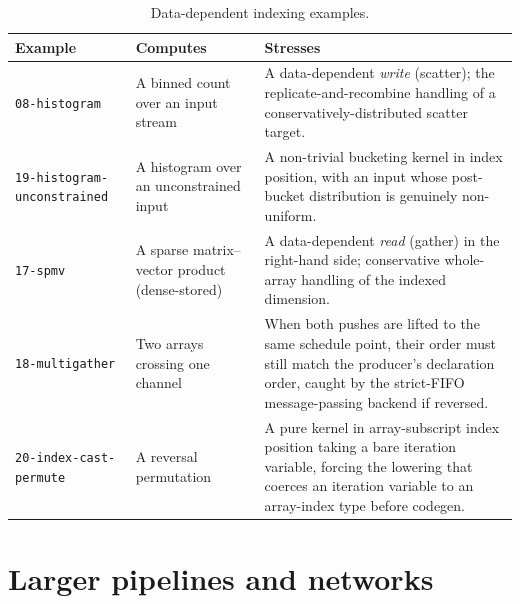 \begin{table}[htbp]
  \centering
  \small
  \begin{tabular}{@{}p{}p{}p{}@{}}
    \toprule
    Example & Computes & Stresses \\
    \midrule
    \texttt{08-histogram} & A binned count over an input stream & A data-dependent
      \emph{write} (scatter); the replicate-and-recombine handling of a
      conservatively-distributed scatter target. \\
    \texttt{19-histogram-unconstrained} & A histogram over an unconstrained input &
      A non-trivial bucketing kernel in index position, with an input whose
      post-bucket distribution is genuinely non-uniform. \\
    \texttt{17-spmv} & A sparse matrix--vector product (dense-stored) & A
      data-dependent \emph{read} (gather) in the right-hand side; conservative
      whole-array handling of the indexed dimension. \\
    \texttt{18-multigather} & Two arrays crossing one channel & When both pushes are
      lifted to the same schedule point, their order must still match the producer's
      declaration order, caught by the strict-FIFO message-passing backend if
      reversed. \\
    \texttt{20-index-cast-permute} & A reversal permutation & A pure kernel in
      array-subscript index position taking a bare iteration variable, forcing the
      lowering that coerces an iteration variable to an array-index type before
      codegen. \\
    \bottomrule
  \end{tabular}
  \caption{Data-dependent indexing examples.}
  \label{tab:examples-indexing}
\end{table}

\section{Larger pipelines and networks}

